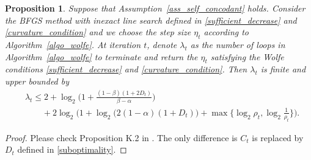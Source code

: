 \documentclass[11pt,letterpaper]{article}
\newcommand\0{{\Vector{0}}}
\newcommand\1{{\Vector{1}}}
\newtheorem{proposition}[theorem]{Proposition}
\numberwithin{assumption}{section}
\numberwithin{definition}{section}
\numberwithin{theorem}{section}
\numberwithin{remark}{section}
\begin{document}
\begin{proposition}\label{proposition_stepsize}
    Suppose that Assumption~\ref{ass_self_concodant} holds. Consider the BFGS method with inexact line search defined in \eqref{sufficient_decrease} and \eqref{curvature_condition} and we choose the step size $\eta_t$ according to Algorithm~\ref{algo_wolfe}. At iteration $t$, denote $\lambda_t$ as the number of loops in Algorithm~\ref{algo_wolfe} to terminate and return the $\eta_t$ satisfying the Wolfe conditions \eqref{sufficient_decrease} and \eqref{curvature_condition}. Then $\lambda_t$ is finite and upper bounded by
    \begin{equation}
    \begin{split}
        & \lambda_t \leq 2 + \log_{2}\Big(1 + \frac{(1 - \beta)(1 + 2D_t)}{\beta - \alpha}\Big) \\
        & \qquad + 2\log_{2}\Big(1 + \log_{2}\big(2(1 - \alpha)(1 + D_t)\big) + \max\{\log_{2}\rho_t, \log_{2}\frac{1}{\rho_t}\}\Big).
    \end{split}
    \end{equation}
\end{proposition}

\begin{proof}
   Please check Proposition K.2 in \cite{qiujiang2024quasinewton}. The only difference is $C_t$ is replaced by $D_t$ defined in \eqref{suboptimality}.
\end{proof}
\end{document}
